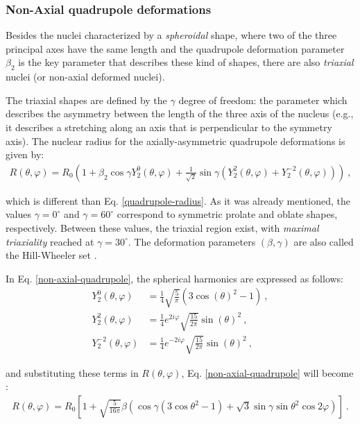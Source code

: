 \subsubsection{Non-Axial quadrupole deformations}

Besides the nuclei characterized by a \emph{spheroidal} shape, where two of the three principal axes have the same length and the quadrupole deformation parameter $\beta_2$ is the key parameter that describes these kind of shapes, there are also \emph{triaxial} nuclei (or non-axial deformed nuclei).

The triaxial shapes are defined by the $\gamma$ degree of freedom: the parameter which describes the asymmetry between the length of the three axis of the nucleus (e.g., it describes a stretching along an axis that is perpendicular to the symmetry axis). The nuclear radius for the axially-asymmetric quadrupole deformations is given by:
\begin{align}
    R(\theta,\varphi)=R_0\left(1+\beta_2\cos\gamma Y_2^0(\theta,\varphi)+\frac{1}{\sqrt{2}}\sin\gamma(Y_2^2(\theta,\varphi)+Y_2^{-2}(\theta,\varphi))\right)\ ,
    \label{non-axial-quadrupole}
\end{align}

which is different than Eq. \ref{quadrupole-radius}. As it was already mentioned, the values $\gamma=0^\circ$ and $\gamma=60^\circ$ correspond to symmetric prolate and oblate shapes, respectively. Between these values, the triaxial region exist, with \emph{maximal triaxiality} reached at $\gamma=30^\circ$. The deformation parameters $(\beta,\gamma)$ are also called the Hill-Wheeler set \cite{wong2008introductory}.

In Eq. \ref{non-axial-quadrupole}, the spherical harmonics are expressed as follows:
\begin{align}
    Y_2^0(\theta,\varphi)&=\frac{1}{4}\sqrt{\frac{5}{\pi}}\left(3\cos(\theta)^2-1\right)\ , \nonumber\\
    Y_2^2(\theta,\varphi)&=\frac{1}{4}e^{2i\varphi}\sqrt{\frac{15}{2\pi}}\sin(\theta)^2\ ,\nonumber\\
    Y_2^{-2}(\theta,\varphi)&=\frac{1}{4}e^{-2i\varphi}\sqrt{\frac{15}{2\pi}}\sin(\theta)^2\ ,
\end{align}

and substituting these terms in $R(\theta,\varphi)$, Eq. \ref{non-axial-quadrupole} will become \cite{andersson1976nuclear,bohr1998nuclear}:
\begin{align}
    R(\theta,\varphi)=R_0\left[1+\sqrt{\frac{5}{16\pi}}\beta\left(\cos\gamma(3\cos\theta^2-1)+\sqrt{3}\sin\gamma\sin\theta^2\cos2\varphi\right)\right]\ .
\end{align}

